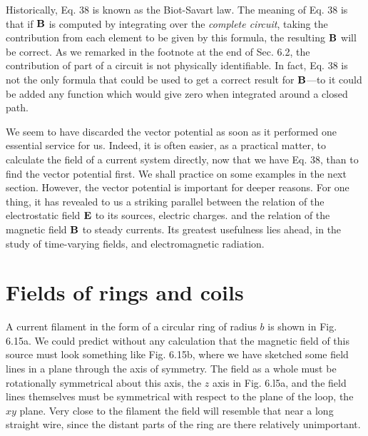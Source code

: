Historically, Eq. 38 is known as the Biot-Savart law. The meaning
of Eq. 38 is that if $\mathbf{B}$ is computed by integrating over the \emph{complete
circuit}, taking the contribution from each element to be given by this
formula, the resulting $\mathbf{B}$ will be correct. As we remarked in the footnote
at the end of Sec. 6.2, the contribution of part of a circuit is not
physically identifiable. In fact, Eq. 38 is not the only formula that
could be used to get a correct result for $\mathbf{B}$---to it could be added any
function which would give zero when integrated around a closed
path.

We seem to have discarded the vector potential as soon as it performed
one essential service for us. Indeed, it is often easier, as a
practical matter, to calculate the field of a current system directly,
now that we have Eq. 38, than to find the vector potential first. We
shall practice on some examples in the next section. However, the
vector potential is important for deeper reasons. For one thing, it
has revealed to us a striking parallel between the relation of the electrostatic
field $\mathbf{E}$ to its sources, electric charges. and the relation of the
magnetic field $\mathbf{B}$ to steady currents. Its greatest usefulness lies ahead,
in the study of time-varying fields, and electromagnetic radiation.

\section{Fields of rings and coils}

A current filament in the form of a circular ring of radius $b$ is shown
in Fig. 6.15a. We could predict without any calculation that the
magnetic field of this source must look something like Fig. 6.15b,
where we have sketched some field lines in a plane through the axis
of symmetry. The field as a whole must be rotationally symmetrical
about this axis, the $z$ axis in Fig. 6.l5a, and the field lines themselves
must be symmetrical with respect to the plane of the loop, the
$xy$ plane. Very close to the filament the field will resemble that near
a long straight wire, since the distant parts of the ring are there relatively
unimportant.

